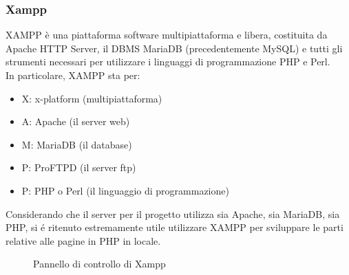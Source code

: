 \documentclass{article}
\begin{document}
\subsubsection*{Xampp}
XAMPP è una piattaforma software multipiattaforma e libera, costituita da Apache HTTP Server, il DBMS MariaDB (precedentemente MySQL) e tutti gli strumenti necessari per utilizzare i linguaggi di programmazione PHP e Perl.\\
In particolare, XAMPP sta per:
\begin{itemize}
	\item X: x-platform (multipiattaforma)
	\item A: Apache (il server web)
	\item M: MariaDB (il database)
	\item P: ProFTPD (il server ftp)
	\item P: PHP o Perl (il linguaggio di programmazione)
\end{itemize}
Considerando che il server per il progetto utilizza sia Apache, sia MariaDB, sia PHP, si é ritenuto estremamente utile utilizzare XAMPP per sviluppare le parti relative alle pagine in PHP in locale.
\begin{figure}[H]
	\centering
	\caption{Pannello di controllo di Xampp}
\end{figure}
\end{document}
